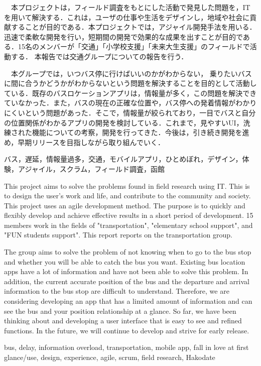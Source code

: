 \documentclass[openany,11pt,papersize,dvipdfm]{jsbook}
\begin{document}
\maketitle

\frontmatter

\begin{jabstract}
　本プロジェクトは，フィールド調査をもとにした活動で発見した問題を，IT を用いて解決する．これは，ユーザの仕事や生活をデザインし，地域や社会に貢献することが目的である．本プロジェクトでは，アジャイル開発手法を用いる．迅速で柔軟な開発を行い，短期間の開発で効果的な成果を出すことが目的である．15名のメンバーが「交通」「小学校支援」「未来大生支援」のフィールドで活動する． 本報告では交通グループについての報告を行う．

　本グループでは，いつバス停に行けばいいのかがわからない， 乗りたいバスに間に合うかどうかがわからないという問題を解決することを目的として活動している．既存のバスロケーションアプリは，情報量が多く，この問題を解決できていなかった．また，バスの現在の正確な位置や，バス停への発着情報がわかりにくいという問題があった．そこで，情報量が絞られており，一目でバスと自分の位置関係がわかるアプリの開発を検討している．これまで，見やすいUI，洗練された機能についての考察，開発を行ってきた．今後は，引き続き開発を進め，早期リリースを目指しながら取り組んでいく．
\begin{jkeyword}
バス，遅延，情報量過多，交通，モバイルアプリ，ひとめぼれ，デザイン，体験，アジャイル，スクラム，フィールド調査，函館
\end{jkeyword}
\end{jabstract}

\begin{eabstract}
This project aims to solve the problems found in field research using IT. This is to design the user's work and life, and contribute to the community and society. This project uses an agile development method. The purpose is to quickly and flexibly develop and achieve effective results in a short period of development. 15 members work in the fields of "transportation", "elementary school support", and "FUN students support". This report reports on the transportation group.

The group aims to solve the problem of not knowing when to go to the bus stop and whether you will be able to catch the bus you want. Existing bus location apps have a lot of information and have not been able to solve this problem. In addition, the current accurate position of the bus and the departure and arrival information to the bus stop are difficult to understand. Therefore, we are considering developing an app that has a limited amount of information and can see the bus and your position relationship at a glance. So far, we have been thinking about and developing a user interface that is easy to see and refined functions. In the future, we will continue to develop and strive for early release.
\begin{ekeyword}
bus, delay, information overload, transportation, mobile app, fall in love at first glance/use, design, experience, agile, scrum, field research, Hakodate
\end{ekeyword}
\end{eabstract}
\end{document}
